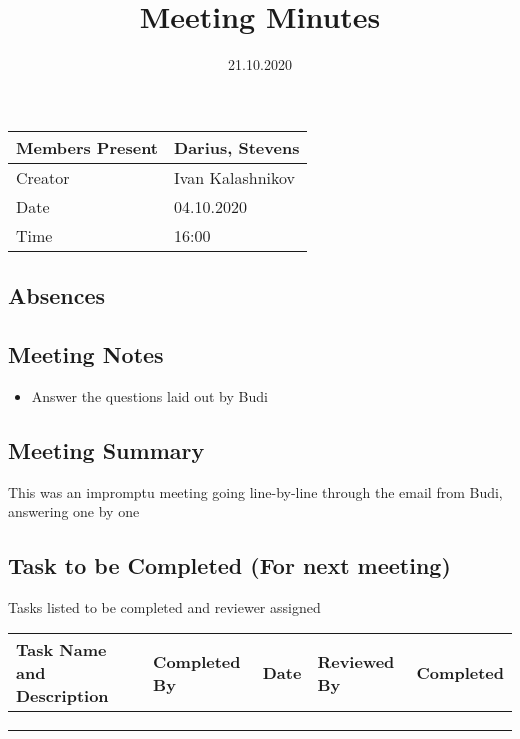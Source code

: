 \documentclass{article}
\title{Meeting Minutes}
\date{21.10.2020}
\begin{document}
\maketitle

\begin{center}
    \begin{tabular}{ | l | p{14cm} |}
    \hline
    Members Present & Darius, Stevens \\ \hline
    Creator         & Ivan Kalashnikov \\ \hline
    Date            & 04.10.2020       \\ \hline
    Time            & 16:00            \\ \hline
    \end{tabular}
\end{center}

\subsection{Absences}

\subsection{Meeting Notes}
\begin{itemize}
    \item Answer the questions laid out by Budi
\end{itemize}

\subsection{Meeting Summary}

This was an impromptu meeting going line-by-line through the email from Budi, answering one by one

\subsection{Task to be Completed (For next meeting) }
Tasks listed to be completed and reviewer assigned
\begin{center}
    \begin{tabular}{|p{9cm}|l|l|l|l|}
    \hline
    Task Name and Description & Completed By & Date & Reviewed By & Completed \\ \hline
                              &              &      &             &           \\ \hline
                              &              &      &             &           \\ \hline
                              &              &      &             &           \\ \hline
    \end{tabular}
    \end{center}
\end{document}
